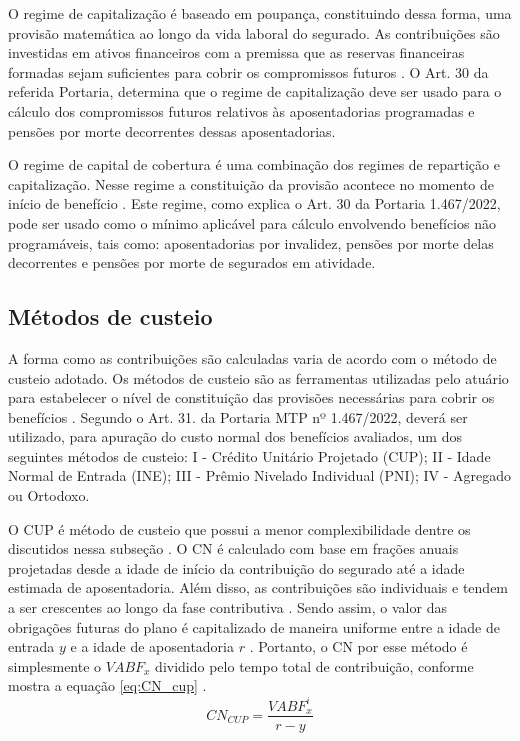 O regime de capitalização é baseado em poupança, constituindo dessa forma, uma provisão matemática ao longo da vida laboral do segurado. As contribuições são investidas em ativos financeiros com a premissa que as reservas financeiras formadas sejam suficientes para cobrir os compromissos futuros \cite{pinheiro2007}. O Art. 30 da referida Portaria, determina que o regime de capitalização deve ser usado para o cálculo dos compromissos futuros relativos às aposentadorias programadas e pensões por morte decorrentes dessas aposentadorias.

O regime de capital de cobertura é uma combinação dos regimes de repartição e capitalização. Nesse regime a constituição da provisão acontece no momento de início de benefício \cite{pinheiro2007}. Este regime, como explica o Art. 30 da Portaria 1.467/2022, pode ser usado como o mínimo aplicável para cálculo envolvendo benefícios não programáveis, tais como: aposentadorias por invalidez, pensões por morte delas decorrentes e pensões por morte de segurados em atividade. 

\subsection{Métodos de custeio}

A forma como as contribuições são calculadas varia de acordo com o método de custeio adotado. Os métodos de custeio são as ferramentas utilizadas pelo atuário para estabelecer o nível de constituição das provisões necessárias para cobrir os benefícios \cite{correa2020premissas, pinheiro2007}. Segundo o Art. 31. da Portaria MTP nº 1.467/2022, deverá ser utilizado, para apuração do custo normal dos benefícios avaliados, um dos seguintes métodos de custeio: I - Crédito Unitário Projetado (CUP); II - Idade Normal de Entrada (INE);  III - Prêmio Nivelado Individual (PNI); IV - Agregado ou Ortodoxo.

O CUP é método de custeio que possui a menor complexibilidade dentre os discutidos nessa subseção \cite{almeidavieira2024}. O CN é calculado com base em frações anuais projetadas desde a idade de início da contribuição do segurado até a idade estimada de aposentadoria. Além disso, as contribuições são individuais e tendem a ser crescentes ao longo da fase contributiva \cite{winklevoos1993}. Sendo assim, o valor das obrigações futuras do plano é capitalizado de maneira uniforme entre a idade de entrada $y$ e a idade de aposentadoria $r$ \cite{winklevoos1993}. Portanto, o CN por esse método é simplesmente o $VABF_x$ dividido pelo tempo total de contribuição, conforme mostra a equação \ref{eq:CN_cup} \cite{winklevoos1993, almeidavieira2024}. 
\begin{equation}
    CN_{CUP} = \frac{VABF^{i}_{x}}{r-y}
    \label{eq:CN_cup}
\end{equation}

